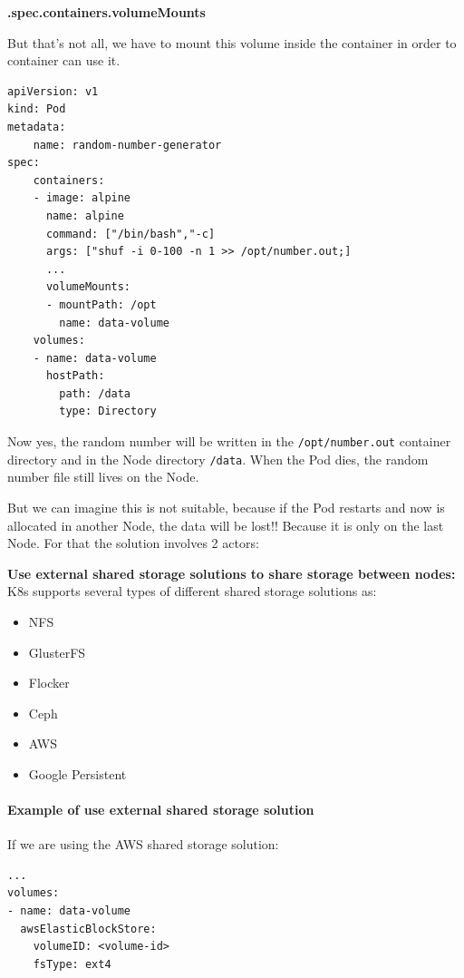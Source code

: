 \documentclass{article}
\newenvironment{codetemplate}[1][]{%
  \mybasecolorbox[#1]
  \itshape
}{%
  \endmybasecolorbox
}
\begin{document}
\textbf{.spec.containers.volumeMounts}

But that's not all,  we have to mount this volume inside the container in order to container can use it.

\begin{codetemplate}{}
\begin{verbatim}
apiVersion: v1
kind: Pod
metadata:
    name: random-number-generator
spec:
    containers:
    - image: alpine
      name: alpine
      command: ["/bin/bash","-c]
      args: ["shuf -i 0-100 -n 1 >> /opt/number.out;]
      ...
      volumeMounts:
      - mountPath: /opt
        name: data-volume
    volumes:
    - name: data-volume
      hostPath:
        path: /data
        type: Directory
\end{verbatim}
\end{codetemplate}

Now yes, the random number will be written in the \verb|/opt/number.out| container directory and in the Node directory \verb|/data|. When the Pod dies, the random number file still lives on the Node.

But we can imagine this is not suitable, because if the Pod restarts and now is allocated in another Node, the data will be lost!! Because it is only on the last Node. For that the solution involves 2 actors:

\textbf{Use external shared storage solutions to share storage between nodes:} K8s supports several types of different shared storage solutions as:
\begin{itemize}
    \item NFS
    \item GlusterFS
    \item Flocker
    \item Ceph
    \item AWS
    \item Google Persistent
\end{itemize}

\paragraph{Example of use external shared storage solution}

If we are using the AWS shared storage solution:
\begin{codetemplate}{}
\begin{verbatim}
...
volumes:
- name: data-volume
  awsElasticBlockStore:
    volumeID: <volume-id>
    fsType: ext4
\end{verbatim}
\end{codetemplate}
\end{document}
